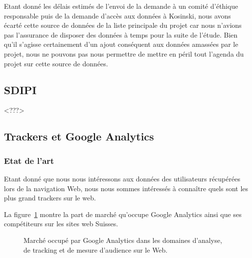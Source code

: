 			Etant donné les délais estimés de l'envoi de la demande à un comité d'éthique responsable puis de la demande d'accès aux données à Kosinski, nous avons écarté cette source de données de la liste principale du projet car nous n'avions pas l'assurance de disposer des données à temps pour la suite de l'étude. Bien qu'il s'agisse certainement d'un ajout conséquent aux données amassées par le projet, nous ne pouvons pas nous permettre de mettre en péril tout l'agenda du projet sur cette source de données.

	\subsection{SDIPI}

		<???>

	\subsection{Trackers et Google Analytics}

		\subsubsection{Etat de l'art}

			Etant donné que nous nous intéressons aux données des utilisateurs récupérées lors de la navigation Web, nous nous sommes intéressés à connaître quels sont les plus grand trackers sur le web.

			La figure~\ref{analytics-usage} montre la part de marché qu'occupe Google Analytics ainsi que ses compétiteurs sur les sites web Suisses.

			\begin{figure}[!h]
				\centering
				\caption{Marché occupé par Google Analytics dans les domaines d'analyse, de tracking et de mesure d'audience sur le Web.}
				\label{analytics-usage}
			\end{figure}

